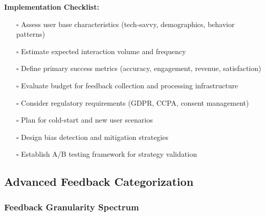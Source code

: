 \textbf{Implementation Checklist:}
\begin{itemize}
    \item[$\square$] Assess user base characteristics (tech-savvy, demographics, behavior patterns)
    \item[$\square$] Estimate expected interaction volume and frequency
    \item[$\square$] Define primary success metrics (accuracy, engagement, revenue, satisfaction)
    \item[$\square$] Evaluate budget for feedback collection and processing infrastructure
    \item[$\square$] Consider regulatory requirements (GDPR, CCPA, consent management)
    \item[$\square$] Plan for cold-start and new user scenarios
    \item[$\square$] Design bias detection and mitigation strategies
    \item[$\square$] Establish A/B testing framework for strategy validation
\end{itemize}

\subsection{Advanced Feedback Categorization}

\subsubsection{Feedback Granularity Spectrum}

